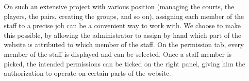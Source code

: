 
On such an extensive project with various position (managing the courts, the
players, the pairs, creating the groups, and so on), assigning each member of
the staff to a precise job can be a convenient way to work with. We choose to
make this possible, by allowing the administrator to assign by hand which part
of the website is attributed to which member of the staff. On the permission
tab, every member of the staff is displayed and can be selected. Once a staff
member is picked, the intended permissions can be ticked on the right panel,
giving him the authorization to operate on certain parts of the website.
